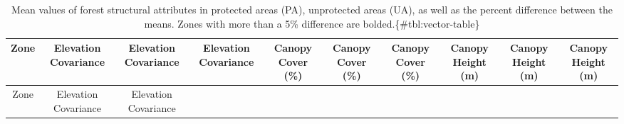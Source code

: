 \documentclass[11pt]{article}
\begin{document}
\begin{longtable}[]{@{}cccccccccc@{}}
\caption{Mean values of forest structural attributes in protected areas
(PA), unprotected areas (UA), as well as the percent difference between
the means. Zones with more than a 5\% difference are
bolded.\{\#tbl:vector-table\}}\tabularnewline
\toprule
\begin{minipage}[b]{0.04\columnwidth}\centering
Zone\strut
\end{minipage} & \begin{minipage}[b]{0.08\columnwidth}\centering
Elevation Covariance\strut
\end{minipage} & \begin{minipage}[b]{0.08\columnwidth}\centering
Elevation Covariance\strut
\end{minipage} & \begin{minipage}[b]{0.08\columnwidth}\centering
Elevation Covariance\strut
\end{minipage} & \begin{minipage}[b]{0.07\columnwidth}\centering
Canopy Cover (\%)\strut
\end{minipage} & \begin{minipage}[b]{0.07\columnwidth}\centering
Canopy Cover (\%)\strut
\end{minipage} & \begin{minipage}[b]{0.07\columnwidth}\centering
Canopy Cover (\%)\strut
\end{minipage} & \begin{minipage}[b]{0.08\columnwidth}\centering
Canopy Height (m)\strut
\end{minipage} & \begin{minipage}[b]{0.08\columnwidth}\centering
Canopy Height (m)\strut
\end{minipage} & \begin{minipage}[b]{0.08\columnwidth}\centering
Canopy Height (m)\strut
\end{minipage}\tabularnewline
\midrule
\endfirsthead
\toprule
\begin{minipage}[b]{0.04\columnwidth}\centering
Zone\strut
\end{minipage} & \begin{minipage}[b]{0.08\columnwidth}\centering
Elevation Covariance\strut
\end{minipage} & \begin{minipage}[b]{0.08\columnwidth}\centering
Elevation Covariance\strut
\end{minipage} & \begin{minipage}[b]{0.08\columnwidth}\centering

\end{minipage}
\end{longtable}
\end{document}

